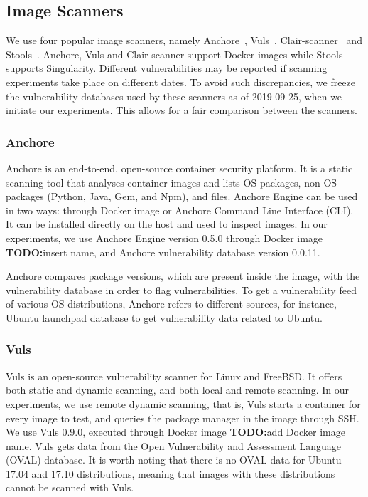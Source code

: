\documentclass[a4paper,num-refs]{oup-contemporary}
\newcommand{\todo}[1]{\color{red}\textbf{TODO:}#1\color{black}}
\begin{document}
\subsection{Image Scanners}

We use four popular image scanners, namely Anchore~\cite{github_2019},
Vuls~\cite{future-architect_2019}, Clair-scanner~\cite{arminc_2019} and
Stools~\cite{stools}. Anchore, Vuls and Clair-scanner support Docker
images while Stools supports Singularity. Different vulnerabilities may be
reported if scanning experiments take place on different dates.
To avoid such discrepancies, we freeze the vulnerability
databases used by these scanners as of 2019-09-25, when we initiate our
experiments. This allows for a fair comparison between the scanners.

\subsubsection{Anchore}

Anchore is an end-to-end, open-source container security platform. It
is a static
scanning tool that analyses container images and lists OS
packages, non-OS packages (Python, Java, Gem, and Npm), and files.
Anchore Engine can be used in two ways: through Docker image or Anchore
Command Line Interface (CLI).
It can be
installed directly on the host and used to inspect images.
In our experiments, we use Anchore Engine version 0.5.0 through Docker image \todo{insert name}, and
Anchore vulnerability database version 0.0.11.

Anchore compares package versions, which are present inside the
image, with the vulnerability database in order to flag vulnerabilities.
To get a vulnerability feed of various OS distributions, Anchore refers to
different sources, for instance, Ubuntu launchpad database to get
vulnerability data related to Ubuntu.

\subsubsection{Vuls}

Vuls is an open-source vulnerability scanner for Linux and FreeBSD. It
offers both static and dynamic scanning, and both local and remote
scanning. In our experiments, we use remote dynamic scanning, that is, Vuls
starts a container for every image to test, and queries the package manager in the image through SSH.
We use Vuls 0.9.0, executed through Docker image \todo{add Docker image name}. Vuls gets data from the Open Vulnerability and Assessment Language (OVAL) database.
It is worth noting that there is no OVAL data for Ubuntu 17.04 and 17.10 distributions,
meaning that images with these distributions cannot be scanned with Vuls.
\end{document}
